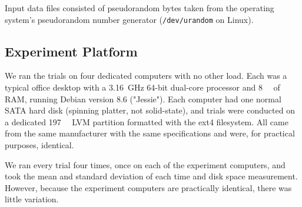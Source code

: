 Input data files consisted of pseudorandom bytes taken from the operating system's pseudorandom number generator (\lstinline{/dev/urandom} on Linux).

%

\subsection{Experiment Platform}

We ran the trials on four dedicated computers with no other load.
Each was a typical office desktop with a \SI{3.16}{\giga\hertz} \num{64}-bit dual-core processor and \SI{8}{\gibi\byte} of RAM, running Debian version 8.6 ("Jessie").
Each computer had one normal SATA hard disk (spinning platter, not solid-state), and trials were conducted on a dedicated \SI{197}{\gibi\byte} LVM partition formatted with the ext4 filesystem.
All came from the same manufacturer with the same specifications and were, for practical purposes, identical.

We ran every trial four times, once on each of the experiment computers, and took the mean and standard deviation of each time and disk space measurement.
However, because the experiment computers are practically identical, there was little variation.

%
